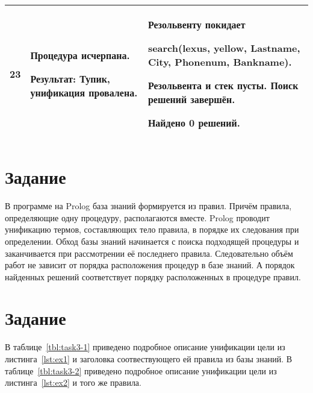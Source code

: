 \begin{longtable}{|c|p{}|p{}|}
    23
                       &
    Процедура исчерпана.
    \newline

    \textbf{Результат:} \newline
    Тупик, унификация провалена.
                       &
    Резольвенту покидает

    search(lexus, yellow, Lastname, City, Phonenum, Bankname).
    \newline

    Резольвента и стек пусты. Поиск решений завершён.

    \textbf{Найдено 0 решений.}
                       \\ \hline
\end{longtable}
\normalsize

\renewcommand{\arraystretch}{1}

\section{Задание }

В программе на Prolog база знаний формируется из правил. Причём правила, определяющие одну процедуру, располагаются вместе. Prolog проводит унификацию термов, составляющих тело правила, в порядке их следования при определении. Обход базы знаний начинается с поиска подходящей процедуры и заканчивается при рассмотрении её последнего правила. Следовательно объём работ не зависит от порядка расположения процедур в базе знаний. А порядок найденных решений соответствует порядку расположенных в процедуре правил.

\section{Задание }
В таблице~\ref{tbl:task3-1} приведено подробное описание унификации цели из листинга~\ref{lst:ex1} и заголовка соотвествующего ей правила из базы знаний. В таблице~\ref{tbl:task3-2} приведено подробное описание унификации цели из листинга~\ref{lst:ex2} и того же правила.


